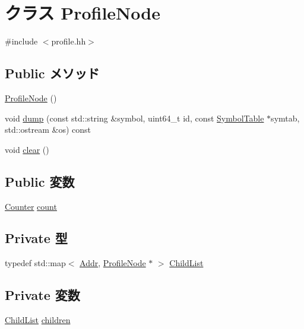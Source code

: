 \hypertarget{classProfileNode}{
\section{クラス ProfileNode}
\label{classProfileNode}
}


{\ttfamily \#include $<$profile.hh$>$}\subsection*{Public メソッド}
\begin{DoxyCompactItemize}
\item 
\hyperlink{classProfileNode_a2f815a2f66dc2a06182d0a98063a6aeb}{ProfileNode} ()
\item 
void \hyperlink{classProfileNode_a3d5d4b4793cd7d5d9b562dc9d44e9d95}{dump} (const std::string \&symbol, uint64\_\-t id, const \hyperlink{classSymbolTable}{SymbolTable} $\ast$symtab, std::ostream \&os) const 
\item 
void \hyperlink{classProfileNode_ac8bb3912a3ce86b15842e79d0b421204}{clear} ()
\end{DoxyCompactItemize}
\subsection*{Public 変数}
\begin{DoxyCompactItemize}
\item 
\hyperlink{base_2types_8hh_ae1475755791765b8e6f6a8bb091e273e}{Counter} \hyperlink{classProfileNode_a265c4451f4ac22dababe512194d09939}{count}
\end{DoxyCompactItemize}
\subsection*{Private 型}
\begin{DoxyCompactItemize}
\item 
typedef std::map$<$ \hyperlink{base_2types_8hh_af1bb03d6a4ee096394a6749f0a169232}{Addr}, \hyperlink{classProfileNode}{ProfileNode} $\ast$ $>$ \hyperlink{classProfileNode_a25eaa93b63ca5aaa4ce454ca8f63fa05}{ChildList}
\end{DoxyCompactItemize}
\subsection*{Private 変数}
\begin{DoxyCompactItemize}
\item 
\hyperlink{classProfileNode_a25eaa93b63ca5aaa4ce454ca8f63fa05}{ChildList} \hyperlink{classProfileNode_aa8705eb9f16550f41bad1af0a206f1f1}{children}
\end{DoxyCompactItemize}
